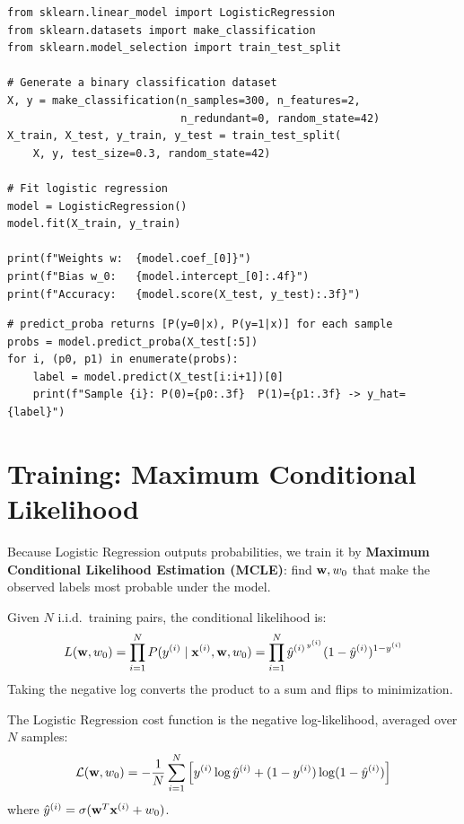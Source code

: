 \begin{lstlisting}[style=pythonstyle]
from sklearn.linear_model import LogisticRegression
from sklearn.datasets import make_classification
from sklearn.model_selection import train_test_split

# Generate a binary classification dataset
X, y = make_classification(n_samples=300, n_features=2,
                           n_redundant=0, random_state=42)
X_train, X_test, y_train, y_test = train_test_split(
    X, y, test_size=0.3, random_state=42)

# Fit logistic regression
model = LogisticRegression()
model.fit(X_train, y_train)

print(f"Weights w:  {model.coef_[0]}")
print(f"Bias w_0:   {model.intercept_[0]:.4f}")
print(f"Accuracy:   {model.score(X_test, y_test):.3f}")
\end{lstlisting}

\begin{lstlisting}[style=pythonstyle]
# predict_proba returns [P(y=0|x), P(y=1|x)] for each sample
probs = model.predict_proba(X_test[:5])
for i, (p0, p1) in enumerate(probs):
    label = model.predict(X_test[i:i+1])[0]
    print(f"Sample {i}: P(0)={p0:.3f}  P(1)={p1:.3f} -> y_hat={label}")
\end{lstlisting}

\section*{Training: Maximum Conditional Likelihood}

Because Logistic Regression outputs probabilities, we train it by \textbf{Maximum Conditional Likelihood Estimation (MCLE)}: find $\mathbf{w}, w_0$ that make the observed labels most probable under the model.

Given $N$ i.i.d.\ training pairs, the conditional likelihood is:
$$L(\mathbf{w}, w_0) = \prod_{i=1}^{N} P(y^{(i)} \mid \mathbf{x}^{(i)}, \mathbf{w}, w_0) = \prod_{i=1}^{N} \hat{y}^{(i)^{\,y^{(i)}}} (1-\hat{y}^{(i)})^{1-y^{(i)}}$$
Taking the negative log converts the product to a sum and flips to minimization.

\begin{definition}
The Logistic Regression cost function is the negative log-likelihood, averaged over $N$ samples:
$$\mathcal{L}(\mathbf{w}, w_0) = -\frac{1}{N}\sum_{i=1}^{N}\Big[y^{(i)}\log\hat{y}^{(i)} + (1-y^{(i)})\log(1-\hat{y}^{(i)})\Big]$$
where $\hat{y}^{(i)} = \sigma(\mathbf{w}^T\mathbf{x}^{(i)} + w_0)$.
\end{definition}

